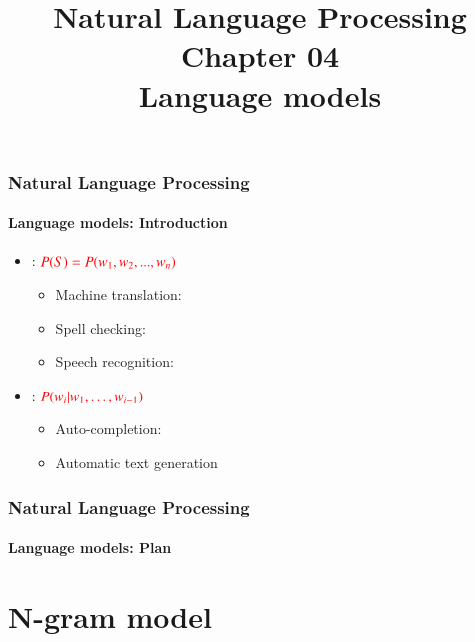 \documentclass[xcolor=table]{beamer}
\title[ESI - NLP: 04- Language models]%
{Natural Language Processing\\Chapter 04\\Language models}
\begin{document}
	
\begin{frame}
\frametitle{Natural Language Processing}
\framesubtitle{Language models: Introduction}

\begin{itemize}
	\item {}: $\color{red} P(S) = P(w_1, w_2, ..., w_n) $
	\begin{itemize}
		\item Machine translation: \\
		\item Spell checking: \\
		\item Speech recognition: \\
	\end{itemize}
	\item {}: $\color{red} P(w_i | w_1, \ldots, w_{i-1}) $
	\begin{itemize}
		\item Auto-completion: \\
		\item Automatic text generation
	\end{itemize}
\end{itemize}

\end{frame}


\begin{frame}
\frametitle{Natural Language Processing}
\framesubtitle{Language models: Plan}

\begin{multicols}{2}
\tableofcontents
\end{multicols}
\end{frame}

\section{N-gram model}
\end{document}

